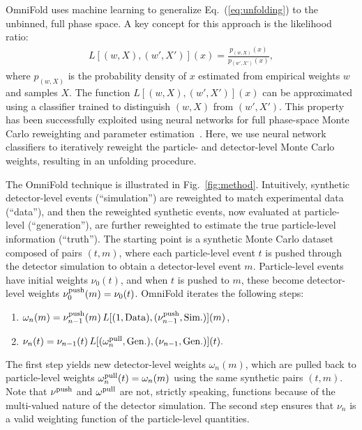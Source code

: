 \documentclass[prl,twocolumn,superscriptaddress,longbibliography,preprintnumbers,nofootinbib]{revtex4-1}
\DeclareRobustCommand{\Fig}[1]{Fig.~\ref{fig:#1}}
\DeclareRobustCommand{\Eq}[1]{Eq.~(\ref{eq:#1})}
\newcommand{\OmniFold}{{\sc OmniFold}\xspace}
\begin{document}
%
\OmniFold uses machine learning to generalize \Eq{unfolding} to the unbinned, full phase space.
%
A key concept for this approach is the likelihood ratio:
\begin{align}
\label{eq:LLR}
L[(w,X),(w',X')](x) = \frac{p_{(w,X)}(x)}{p_{(w',X')}(x)},
\end{align}
where $p_{(w,X)}$ is the probability density of $x$ estimated from empirical weights $w$ and samples $X$.
%
The function $L[(w,X),(w',X')](x)$ can be approximated using a classifier trained to distinguish $(w,X)$ from $(w',X')$.
%
This property has been successfully exploited using neural networks for full phase-space Monte Carlo reweighting and parameter estimation~\cite{Andreassen:2019nnm,Cranmer:2015bka,Brehmer:2018kdj,Brehmer:2018eca,Brehmer:2018hga,Bothmann2019}.
%
Here, we use neural network classifiers to iteratively reweight the particle- and detector-level Monte Carlo weights, resulting in an unfolding procedure.


%
The \OmniFold technique is illustrated in \Fig{method}.
%
Intuitively, synthetic detector-level events (``simulation'') are reweighted to match experimental data (``data''), and then the reweighted synthetic events, now evaluated at particle-level (``generation''), are further reweighted to estimate the true particle-level information (``truth'').
%
The starting point is a synthetic Monte Carlo dataset composed of pairs $(t,m)$, where each particle-level event $t$ is pushed through the detector simulation to obtain a detector-level event $m$.
%
Particle-level events have initial weights $\nu_0(t)$, and when $t$ is pushed to $m$, these become detector-level weights $\nu^{\rm push}_0({m})=\nu_0({t})$.
%
\OmniFold iterates the following steps:
%
\begin{enumerate}
    \item $\omega_{n}( m) = \nu^{\rm push}_{n-1}( m)\,L[(1,\text{Data}),(\nu^{\rm push}_{n-1},\text{Sim.})]( m)$,\label{step1}
    \item $\nu_{n}( t) = \nu_{n-1}( t)\,L[(\omega^{\rm pull}_{n},\text{Gen.}),(\nu_{n-1},\text{Gen.})]( t).$\label{step2}
\end{enumerate}
%
The first step yields new detector-level weights $\omega_{n}({m})$, which are pulled back to particle-level weights $\omega^{\rm pull}_{n}({t})=\omega_{n}({m})$ using the same synthetic pairs $(t,m)$.
%
Note that $\nu^{\rm push}$ and $\omega^{\rm pull}$ are not, strictly speaking, functions because of the multi-valued nature of the detector simulation.
%
The second step ensures that $\nu_{n}$ is a valid weighting function of the particle-level quantities.
\end{document}
